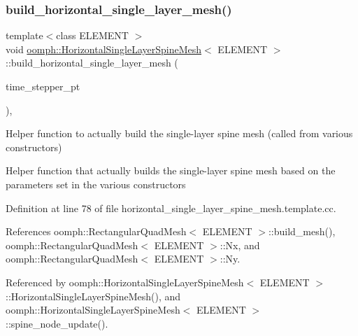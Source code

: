 \subsubsection{\texorpdfstring{build\+\_\+horizontal\+\_\+single\+\_\+layer\+\_\+mesh()}{build\_horizontal\_single\_layer\_mesh()}}
{\footnotesize\ttfamily template$<$class E\+L\+E\+M\+E\+NT $>$ \\
void \hyperlink{classoomph_1_1HorizontalSingleLayerSpineMesh}{oomph\+::\+Horizontal\+Single\+Layer\+Spine\+Mesh}$<$ E\+L\+E\+M\+E\+NT $>$\+::build\+\_\+horizontal\+\_\+single\+\_\+layer\+\_\+mesh (\begin{DoxyParamCaption}\item[{Time\+Stepper $\ast$}]{time\+\_\+stepper\+\_\+pt }\end{DoxyParamCaption})\hspace{0.3cm}{\ttfamily [protected]}, {\ttfamily [virtual]}}



Helper function to actually build the single-\/layer spine mesh (called from various constructors) 

Helper function that actually builds the single-\/layer spine mesh based on the parameters set in the various constructors 

Definition at line 78 of file horizontal\+\_\+single\+\_\+layer\+\_\+spine\+\_\+mesh.\+template.\+cc.



References oomph\+::\+Rectangular\+Quad\+Mesh$<$ E\+L\+E\+M\+E\+N\+T $>$\+::build\+\_\+mesh(), oomph\+::\+Rectangular\+Quad\+Mesh$<$ E\+L\+E\+M\+E\+N\+T $>$\+::\+Nx, and oomph\+::\+Rectangular\+Quad\+Mesh$<$ E\+L\+E\+M\+E\+N\+T $>$\+::\+Ny.



Referenced by oomph\+::\+Horizontal\+Single\+Layer\+Spine\+Mesh$<$ E\+L\+E\+M\+E\+N\+T $>$\+::\+Horizontal\+Single\+Layer\+Spine\+Mesh(), and oomph\+::\+Horizontal\+Single\+Layer\+Spine\+Mesh$<$ E\+L\+E\+M\+E\+N\+T $>$\+::spine\+\_\+node\+\_\+update().

\mbox{\label{classoomph_1_1HorizontalSingleLayerSpineMesh_a4b9b833a281aa64a809b4e47159282e6}} 
